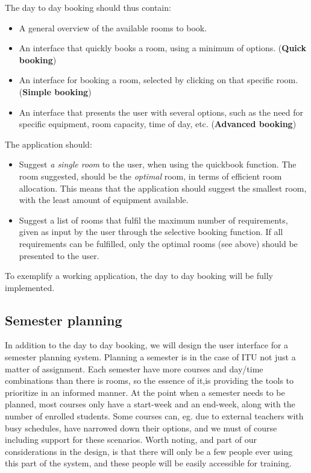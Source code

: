 The day to day booking should thus contain:

\begin{itemize}
	\item A general overview of the available rooms to book.
	\item An interface that quickly books a room, using a minimum of options. (\textbf{Quick booking})
	\item An interface for booking a room, selected by clicking on that specific room. (\textbf{Simple booking})
	\item An interface that presents the user with several options, such as the need for specific equipment, room capacity, time of day, etc. (\textbf{Advanced booking})
\end{itemize}

The application should:

\begin{itemize}
	\item Suggest \emph{a single room} to the user, when using the quickbook function. The room suggested, should be the \emph{optimal} room, in terms of efficient room allocation. This means that the application should suggest the smallest room, with the least amount of equipment available.
	\item Suggest a list of rooms that fulfil the maximum number of requirements, given as input by the user through the selective booking function. If all requirements can be fulfilled, only the optimal rooms (see above) should be presented to the user.
\end{itemize}

To exemplify a working application, the day to day booking will be fully implemented.

\subsection{Semester planning}
\label{chap1:semester_planning}
In addition to the day to day booking, we will design the user interface for a semester planning system. Planning a semester is in the case of ITU not just a matter of assignment. Each semester have more courses and day/time combinations than there is rooms, so the essence of it,is providing the tools to prioritize in an informed manner. At the point when a semester needs to be planned, most courses only have a start-week and an end-week, along with the number of enrolled students. Some courses can, eg. due to external teachers with busy schedules, have narrowed down their options, and we must of course including support for these scenarios.
Worth noting, and part of our considerations in the design, is that there will only be a few people ever using this part of the system, and these people will be easily accessible for training.

